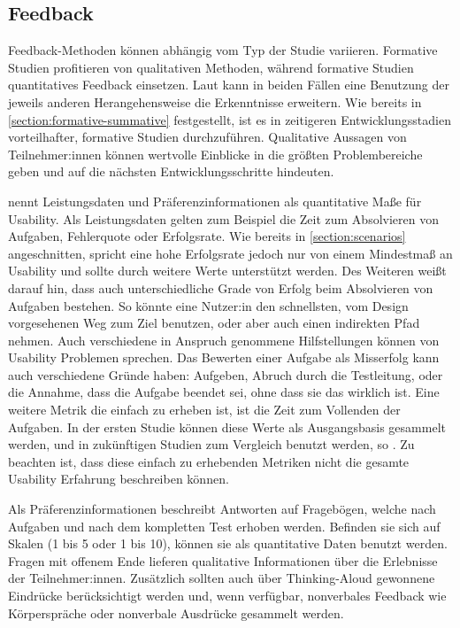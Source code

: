 \subsection{Feedback}

Feedback-Methoden können abhängig vom Typ der Studie variieren. Formative Studien profitieren von
qualitativen Methoden, während formative Studien quantitatives Feedback einsetzen. Laut
\textcite{barnumUsabilityTesting2021} kann in beiden Fällen eine Benutzung der jeweils anderen
Herangehensweise die Erkenntnisse erweitern. Wie bereits in \ref{section:formative-summative}
festgestellt, ist es in zeitigeren Entwicklungsstadien vorteilhafter, formative Studien
durchzuführen.  Qualitative Aussagen von
Teilnehmer:innen können wertvolle Einblicke in die größten Problembereiche geben und auf die
nächsten Entwicklungsschritte hindeuten.
\parencite{barnumUsabilityTesting2021}

\textcite{barnumUsabilityTesting2021} nennt Leistungsdaten und Präferenzinformationen als
quantitative Maße für Usability. Als Leistungsdaten gelten zum Beispiel die Zeit zum Absolvieren von
Aufgaben, Fehlerquote oder Erfolgsrate. Wie bereits in \ref{section:scenarios} angeschnitten,
spricht eine hohe Erfolgsrate jedoch nur von einem Mindestmaß an Usability und sollte durch weitere
Werte unterstützt werden. Des Weiteren weißt \textcite{barnumUsabilityTesting2021} darauf hin, dass
auch unterschiedliche Grade von Erfolg beim Absolvieren von Aufgaben bestehen. So könnte eine
Nutzer:in den schnellsten, vom Design vorgesehenen Weg zum Ziel benutzen, oder aber auch einen
indirekten Pfad nehmen. Auch verschiedene in Anspruch genommene Hilfstellungen können von Usability
Problemen sprechen. Das Bewerten einer Aufgabe als Misserfolg kann auch verschiedene Gründe haben:
Aufgeben, Abruch durch die Testleitung, oder die Annahme, dass die Aufgabe beendet sei, ohne dass
sie das wirklich ist. Eine weitere Metrik die einfach zu erheben ist, ist die Zeit zum Vollenden der
Aufgaben. In der ersten Studie können diese Werte als Ausgangsbasis gesammelt werden, und in
zukünftigen Studien zum Vergleich benutzt werden, so \textcite{barnumUsabilityTesting2021}. Zu
beachten ist, dass diese einfach zu erhebenden Metriken nicht die gesamte Usability Erfahrung
beschreiben können.
\parencite{barnumUsabilityTesting2021}

Als Präferenzinformationen beschreibt \textcite{barnumUsabilityTesting2021} Antworten auf
Fragebögen, welche nach Aufgaben und nach dem kompletten Test erhoben werden. Befinden sie sich auf
Skalen (1 bis 5 oder 1 bis 10), können sie als quantitative Daten benutzt werden. Fragen mit offenem
Ende lieferen qualitative Informationen über die Erlebnisse der Teilnehmer:innen. Zusätzlich sollten
auch über Thinking-Aloud gewonnene Eindrücke berücksichtigt werden und, wenn verfügbar,
nonverbales Feedback wie Körperspräche oder nonverbale Ausdrücke gesammelt werden.
\parencite{barnumUsabilityTesting2021}

